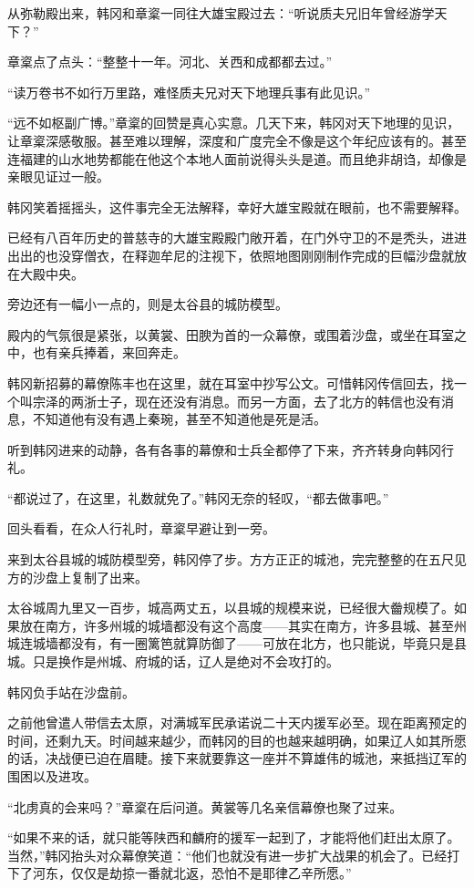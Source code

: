 从弥勒殿出来，韩冈和章楶一同往大雄宝殿过去：“听说质夫兄旧年曾经游学天下？”

章楶点了点头：“整整十一年。河北、关西和成都都去过。”

“读万卷书不如行万里路，难怪质夫兄对天下地理兵事有此见识。”

“远不如枢副广博。”章楶的回赞是真心实意。几天下来，韩冈对天下地理的见识，让章楶深感敬服。甚至难以理解，深度和广度完全不像是这个年纪应该有的。甚至连福建的山水地势都能在他这个本地人面前说得头头是道。而且绝非胡诌，却像是亲眼见证过一般。

韩冈笑着摇摇头，这件事完全无法解释，幸好大雄宝殿就在眼前，也不需要解释。

已经有八百年历史的普慈寺的大雄宝殿殿门敞开着，在门外守卫的不是秃头，进进出出的也没穿僧衣，在释迦牟尼的注视下，依照地图刚刚制作完成的巨幅沙盘就放在大殿中央。

旁边还有一幅小一点的，则是太谷县的城防模型。

殿内的气氛很是紧张，以黄裳、田腴为首的一众幕僚，或围着沙盘，或坐在耳室之中，也有亲兵捧着，来回奔走。

韩冈新招募的幕僚陈丰也在这里，就在耳室中抄写公文。可惜韩冈传信回去，找一个叫宗泽的两浙士子，现在还没有消息。而另一方面，去了北方的韩信也没有消息，不知道他有没有遇上秦琬，甚至不知道他是死是活。

听到韩冈进来的动静，各有各事的幕僚和士兵全都停了下来，齐齐转身向韩冈行礼。

“都说过了，在这里，礼数就免了。”韩冈无奈的轻叹，“都去做事吧。”

回头看看，在众人行礼时，章楶早避让到一旁。

来到太谷县城的城防模型旁，韩冈停了步。方方正正的城池，完完整整的在五尺见方的沙盘上复制了出来。

太谷城周九里又一百步，城高两丈五，以县城的规模来说，已经很大齤规模了。如果放在南方，许多州城的城墙都没有这个高度——其实在南方，许多县城、甚至州城连城墙都没有，有一圈篱笆就算防御了——可放在北方，也只能说，毕竟只是县城。只是换作是州城、府城的话，辽人是绝对不会攻打的。

韩冈负手站在沙盘前。

之前他曾遣人带信去太原，对满城军民承诺说二十天内援军必至。现在距离预定的时间，还剩九天。时间越来越少，而韩冈的目的也越来越明确，如果辽人如其所愿的话，决战便已迫在眉睫。接下来就要靠这一座并不算雄伟的城池，来抵挡辽军的围困以及进攻。

“北虏真的会来吗？”章楶在后问道。黄裳等几名亲信幕僚也聚了过来。

“如果不来的话，就只能等陕西和麟府的援军一起到了，才能将他们赶出太原了。当然，”韩冈抬头对众幕僚笑道：“他们也就没有进一步扩大战果的机会了。已经打下了河东，仅仅是劫掠一番就北返，恐怕不是耶律乙辛所愿。”

